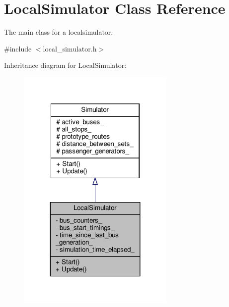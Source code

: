 \hypertarget{classLocalSimulator}{}\section{Local\+Simulator Class Reference}
\label{classLocalSimulator}


The main class for a localsimulator.  




{\ttfamily \#include $<$local\+\_\+simulator.\+h$>$}



Inheritance diagram for Local\+Simulator\+:\nopagebreak
\begin{figure}[H]
\begin{center}
\leavevmode
\includegraphics[width=215pt]{classLocalSimulator__inherit__graph}
\end{center}
\end{figure}


